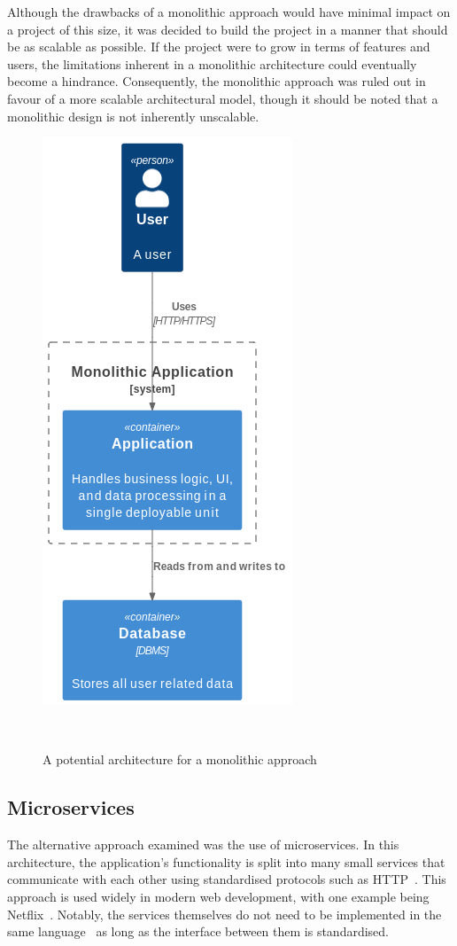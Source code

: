 Although the drawbacks of a monolithic approach would have minimal impact on a project of this size, it was decided to build the project in a manner that should be as scalable as possible. If the project were to grow in terms of features and users, the limitations inherent in a monolithic architecture could eventually become a hindrance. Consequently, the monolithic approach was ruled out in favour of a more scalable architectural model, though it should be noted that a monolithic design is not inherently unscalable.

\begin{figure} [H]
    \centering
    \includegraphics[width=0.35\linewidth]{figures/monolithic_arch.png}
    \caption{A potential architecture for a monolithic approach}
~\label{fig:monolith-arch}
\end{figure}

\subsection{Microservices}
The alternative approach examined was the use of microservices. In this architecture, the application's functionality is split into many small services that communicate with each other using standardised protocols such as HTTP~\cite{8354423}. This approach is used widely in modern web development, with one example being Netflix~\cite{NetflixMicroservices}. Notably, the services themselves do not need to be implemented in the same language~\cite{7030212} as long as the interface between them is standardised.

